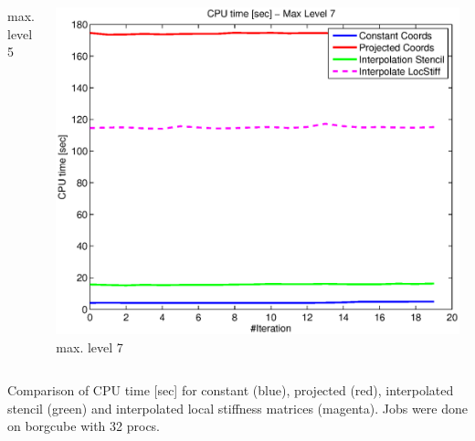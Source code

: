 \documentclass[t,compress=false,usepdftitle=false]{beamer}
\begin{document}
\begin{frame}
\begin{columns}[T]
\begin{column}[T]{4.3cm}
  max. level 5
\end{column}\hfill
\begin{column}[T]{4.3cm} 
  \centering
  \includegraphics[width=0.98\textwidth]{spherepoisson_cpuTime_level7}\\
  max. level 7
\end{column}
\end{columns}
\vspace{0.5cm}
\centering
Comparison of CPU time [sec] for constant (blue), projected (red), interpolated
stencil (green) and interpolated local stiffness matrices (magenta).
Jobs were done on borgcube with 32 procs.
\end{frame}
\end{document}
